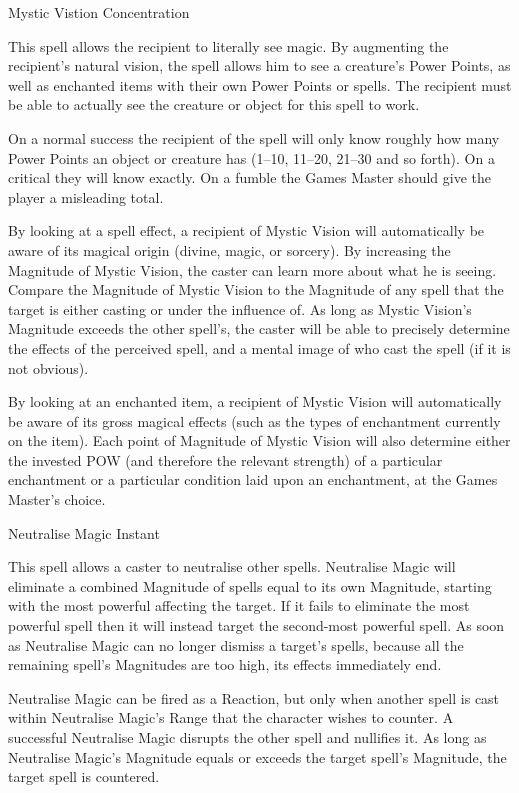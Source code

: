 \begin{samepage}
\begin{rpg-spell}
{Mystic Vistion}
{Concentration}

This spell allows the recipient to literally see magic. By augmenting the recipient’s natural vision, the spell allows him to see a creature’s Power Points, as well as enchanted items with their own Power Points or spells. The recipient must be able to actually see the creature or object for this spell to work.

On a normal success the recipient of the spell will only know roughly how many Power Points an object or creature has (1–10, 11–20, 21–30 and so forth). On a critical they will know exactly. On a fumble the Games Master should give the player a misleading total.

By looking at a spell effect, a recipient of Mystic Vision will automatically be aware of its magical origin (divine, magic, or sorcery). By increasing the Magnitude of Mystic Vision, the caster can learn more about what he is seeing. Compare the Magnitude of Mystic Vision to the Magnitude of any spell that the target is either casting or under the influence of. As long as Mystic Vision’s Magnitude exceeds the other spell’s, the caster will be able to precisely determine the effects of the perceived spell, and a mental image of who cast the spell (if it is not obvious). 

By looking at an enchanted item, a recipient of Mystic Vision will automatically be aware of its gross magical effects (such as the types of enchantment currently on the item). Each point of Magnitude of Mystic Vision will also determine either the invested POW (and therefore the relevant strength) of a particular enchantment or a particular condition laid upon an enchantment, at the Games Master’s choice.
\end{rpg-spell}
\end{samepage}


\begin{samepage}
\begin{rpg-spell}
{Neutralise Magic}
{Instant}

This spell allows a caster to neutralise other spells. Neutralise Magic will eliminate a combined Magnitude of spells equal to its own Magnitude, starting with the most powerful affecting the target. If it fails to eliminate the most powerful spell then it will instead target the second-most powerful spell. As soon as Neutralise Magic can no longer dismiss a target’s spells, because all the remaining spell’s Magnitudes are too high, its effects immediately end. 

Neutralise Magic can be fired as a Reaction, but only when another spell is cast within Neutralise Magic’s Range that the character wishes to counter. A successful Neutralise Magic disrupts the other spell and nullifies it. As long as Neutralise Magic’s Magnitude equals or exceeds the target spell’s Magnitude, the target spell is countered. 
\end{rpg-spell}
\end{samepage}


